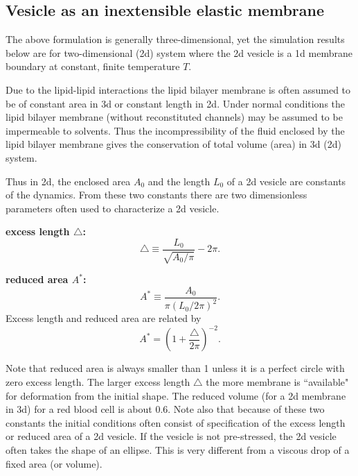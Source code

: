 \documentclass[11pt]{article}
\begin{document}
\subsection{Vesicle as an inextensible elastic membrane}
The above formulation is generally three-dimensional, yet the simulation results below are for two-dimensional (2d) system where
the 2d vesicle is a 1d membrane boundary at constant, finite temperature $T$. 

Due to the lipid-lipid interactions the lipid bilayer membrane
is often assumed to be of constant area in 3d or constant length in 2d. Under normal conditions the lipid bilayer membrane (without reconstituted channels) 
may be assumed to be impermeable to solvents. Thus the incompressibility of the fluid enclosed by the lipid bilayer membrane gives the conservation of total volume (area)
in 3d (2d) system.

Thus in 2d, the enclosed area $A_0$ and the length $L_0$ of a 2d vesicle are constants of the dynamics. From these two constants there are two dimensionless parameters
often used to characterize a 2d vesicle.

\noindent
{\bf excess length $\triangle$:}
%
\[
\triangle\equiv \frac{L_0}{\sqrt{A_0/\pi}}-2\pi.\]

\noindent
{\bf reduced area $A^*$:}
%
\[ A^*\equiv \frac{A_0}{\pi (L_0/2\pi)^2}.\]
%
Excess length and reduced area are related by
\[
A^* = \left(1+\frac{\triangle}{2\pi}\right)^{-2}. \]

Note that reduced area is always smaller than 1 unless it is a perfect circle with zero excess length.
The larger excess length $\triangle$ the more membrane is ``available" for deformation from the initial shape. 
The reduced volume (for a 2d membrane in 3d) for a red blood cell is about $0.6$.
Note also that because of these two constants the initial conditions often consist of specification of the excess length or reduced area of a 2d vesicle.
If the vesicle is not pre-stressed, the 2d vesicle often takes the shape of an ellipse. This is very different from a viscous drop of a fixed area (or volume).
\end{document}
